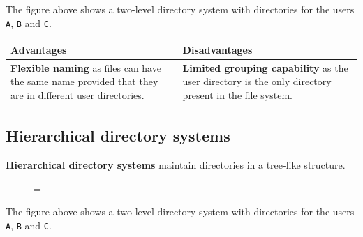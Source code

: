 \documentclass[a4paper]{systems-software}
\begin{document}
The figure above shows a two-level directory system with directories for the users \texttt{A}, \texttt{B} and \texttt{C}.

\begin{longtabu} to \textwidth {| X[1,l] | X[1,l] |}
    \hline
    \textbf{Advantages} & \textbf{Disadvantages}
	\\ \hline
	\textbf{Flexible naming} as files can have the same name provided that they are in different user directories. &
	\textbf{Limited grouping capability} as the user directory is the only directory present in the file system.
	\\ \hline
\end{longtabu}


\newpage

\subsection*{Hierarchical directory systems}

\textbf{Hierarchical directory systems} maintain directories in a tree-like structure.

\begin{figure}[H]
  \lineskip=-\fboxrule
\end{figure}

The figure above shows a two-level directory system with directories for the users \texttt{A}, \texttt{B} and \texttt{C}.
\end{document}
